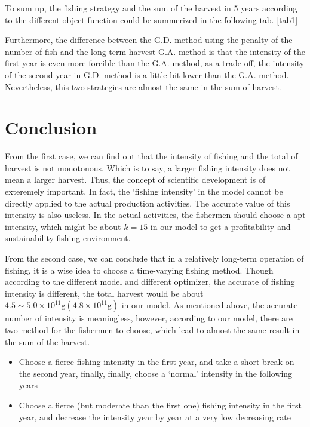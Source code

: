 \documentclass{IEEEtran}
\begin{document}
To sum up, the fishing strategy and the sum of the harvest in 5 years according to the different object function could be summerized in the following tab. \ref{tab1}

Furthermore, the difference between the G.D. method using the penalty of the number of fish and the long-term harvest G.A. method is that the intensity of the first year is even more forcible than the G.A. method, as a trade-off, the intensity of the second year in G.D. method is a little bit lower than the G.A. method. Nevertheless, this two strategies are almost the same in the sum of harvest. 

\section{Conclusion}

From the first case, we can find out that the intensity of fishing and the total of harvest is not monotonous. Which is to say, a larger fishing intensity does not mean a larger harvest. Thus, the concept of scientific development is of exteremely important. In fact, the `fishing intensity'  in the model cannot be directly applied to the actual production activities. The accurate value of this intensity is also useless. In the actual activities, the fishermen should choose a apt intensity, which might be about $k = 15$ in our model to get a profitability and sustainability fishing environment.

From the second case, we can conclude that in a relatively long-term operation of fishing, it is a wise idea to choose a time-varying fishing method. Though according to the different model and different optimizer, the accurate of fishing intensity is different, the total harvest would be about $4.5\sim 5.0 \times 10^{11}\mathrm g (4.8 \times 10^{11} \mathrm g)$ in our model. As mentioned above, the accurate number of intensity is meaningless, however, according to our model, there are two method for the fishermen to choose, which lead to almost the same result in the sum of the harvest.

\begin{itemize}
    \item {Choose a fierce fishing intensity in the first year, and take a short break on the second year, finally, finally, choose a `normal' intensity in the following years}
    \item {Choose a fierce (but moderate than the first one) fishing intensity in the first year, and decrease the intensity year by year at a very low decreasing rate}
\end{itemize}
\end{document}
